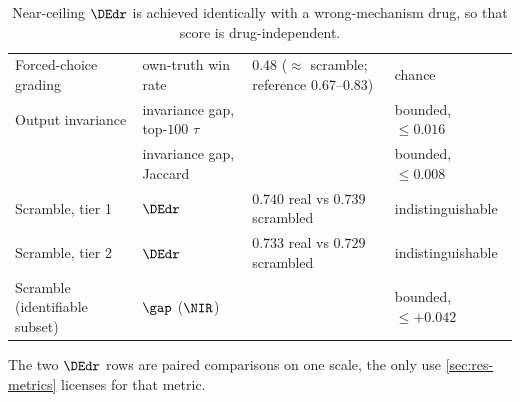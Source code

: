 \begin{table}[htbp]
\caption{ Near-ceiling
$\DEdr$ is achieved identically with a wrong-mechanism drug, so that score is
drug-independent.}
\label{tab:blind}
\begin{fullwidth}
\begin{threeparttable}
\begin{tabularx}{\linewidth}{@{}l l l Y@{}}
 &  &  &  \\
\midrule
Forced-choice grading & own-truth win rate
  & $0.48$ ($\approx$ scramble; reference 0.67--0.83) & chance \\
\addlinespace[10pt]
Output invariance & invariance gap, top-$100$ $\tau$ & 
  & bounded, $\leq 0.016$ \\
 & invariance gap, Jaccard & 
  & bounded, $\leq 0.008$ \\
\addlinespace[10pt]
Scramble, tier 1 & $\DEdr$ & $0.740$ real vs $0.739$ scrambled
  & indistinguishable \\
Scramble, tier 2 & $\DEdr$ & $0.733$ real vs $0.729$ scrambled
  & indistinguishable \\
Scramble (identifiable subset) & $\gap$ ($\NIR$) & 
  & bounded, $\leq +0.042$ \\
\end{tabularx}
\begin{tablenotes}[flushleft]
\item The two $\DEdr$ rows are paired comparisons on one scale, the only use
\cref{sec:res-metrics} licenses for that metric.
\end{tablenotes}
\end{threeparttable}
\end{fullwidth}
\end{table}

